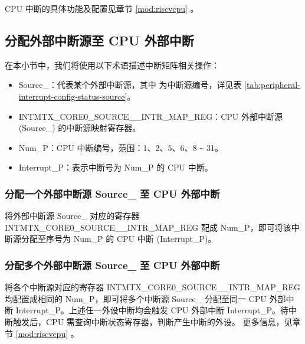 \documentclass[main\_\_CN.tex]{subfiles}
\begin{document}
\begin{tiplisting}
CPU 中断的具体功能及配置见章节 \ref{mod:riscvcpu} \textit{}。
\end{tiplisting}
\vspace{-1em}







\subsection{分配外部中断源至 CPU 外部中断}

在本小节中，我们将使用以下术语描述中断矩阵相关操作：

\begin{itemize}

\item Source\_：代表某个外部中断源，其中  为中断源编号，详见表 \ref{tab:peripheral-interrupt-config-status-source}。

\item INTMTX\_CORE0\_SOURCE\_\_INTR\_MAP\_REG：CPU 外部中断源 (Source\_) 的中断源映射寄存器。
\item Num\_P：CPU 中断编号，范围：1、2、5、6、8 \verb+~+ 31。
\item Interrupt\_P：表示中断号为 Num\_P 的 CPU 中断。

\end{itemize}

\subsubsection{分配一个外部中断源 Source\_ 至 CPU 外部中断}

将外部中断源 Source\_ 对应的寄存器 INTMTX\_CORE0\_SOURCE\_\_INTR\_MAP\_REG 配成 Num\_P，即可将该中断源分配至序号为 Num\_P 的 CPU 中断 (Interrupt\_P)。

\subsubsection{分配多个外部中断源 Source\_ 至 CPU 外部中断}

将各个中断源对应的寄存器 INTMTX\_CORE0\_SOURCE\_\_INTR\_MAP\_REG 均配置成相同的 Num\_P，即可将多个中断源 Source\_ 分配至同一 CPU 外部中断 Interrupt\_P。上述任一外设中断均会触发 CPU 外部中断 Interrupt\_P。待中断触发后，CPU 需查询中断状态寄存器，判断产生中断的外设。 更多信息，见章节 \ref{mod:riscvcpu} \textit{}。
\end{document}
